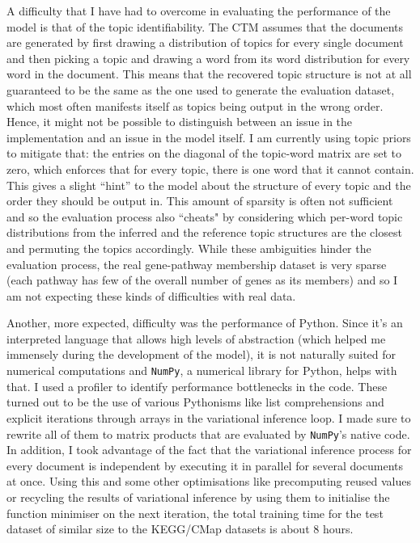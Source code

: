 \documentclass[12pt,a4]{article}
\begin{document}
A difficulty that I have had to overcome in evaluating the performance of the model is that of the topic identifiability. The CTM assumes that the documents are generated by first drawing a distribution of topics for every single document and then picking a topic and drawing a word from its word distribution for every word in the document. This means that the recovered topic structure is not at all guaranteed to be the same as the one used to generate the evaluation dataset, which most often manifests itself as topics being output in the wrong order. Hence, it might not be possible to distinguish between an issue in the implementation and an issue in the model itself. I am currently using topic priors to mitigate that: the entries on the diagonal of the topic-word matrix are set to zero, which enforces that for every topic, there is one word that it cannot contain. This gives a slight ``hint'' to the model about the structure of every topic and the order they should be output in. This amount of sparsity is often not sufficient and so the evaluation process also ``cheats" by considering which per-word topic distributions from the inferred and the reference topic structures are the closest and permuting the topics accordingly. While these ambiguities hinder the evaluation process, the real gene-pathway membership dataset is very sparse (each pathway has few of the overall number of genes as its members) and so I am not expecting these kinds of difficulties with real data.

Another, more expected, difficulty was the performance of Python. Since it's an interpreted language that allows high levels of abstraction (which helped me immensely during the development of the model), it is not naturally suited for numerical computations and \texttt{NumPy}, a numerical library for Python, helps with that. I used a profiler to identify performance bottlenecks in the code. These turned out to be the use of various Pythonisms like list comprehensions and explicit iterations through arrays in the variational inference loop. I made sure to rewrite all of them to matrix products that are evaluated by \texttt{NumPy}'s native code. In addition, I took advantage of the fact that the variational inference process for every document is independent by executing it in parallel for several documents at once. Using this and some other optimisations like precomputing reused values or recycling the results of variational inference by using them to initialise the function minimiser on the next iteration, the total training time for the test dataset of similar size to the KEGG/CMap datasets is about 8 hours.
\end{document}
